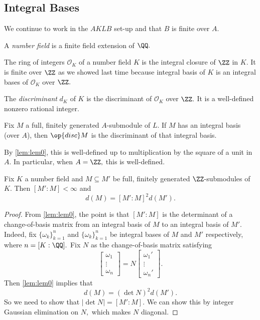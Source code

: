 \documentclass[../notes.tex]{subfiles}
\begin{document}
\subsection{Integral Bases}
We continue to work in the $AKLB$ set-up and that $B$ is finite over $A.$
\begin{defi}
    A \textit{number field} is a finite field extension of $\QQ.$
\end{defi}
\begin{defi}
    The ring of integers $\mathcal O_K$ of a number field $K$ is the integral closure of $\ZZ$ in $K.$ It is finite over $\ZZ$ as we showed last time because integral basis of $K$ is an integral bases of $\mathcal O_K$ over $\ZZ.$
\end{defi}
\begin{defi}[Discriminant]
    The \textit{discriminant} $d_K$ of $K$ is the discriminant of $\mathcal O_K$ over $\ZZ.$ It is a well-defined nonzero rational integer.
\end{defi}
\begin{defi}
    Fix $M$ a full, finitely generated $A$-submodule of $L.$ If $M$ has an integral basis (over $A$), then $\op{disc}M$ is the discriminant of that integral basis.
\end{defi}
\begin{remark}
    By \autoref{lem:lem0}, this is well-defined up to multiplication by the square of a unit in $A.$ In particular, when $A=\ZZ,$ this is well-defined.
\end{remark}
\begin{prop} \label{prop:212}
    Fix $K$ a number field and $M\subseteq M'$ be full, finitely generated $\ZZ$-submodules of $K.$ Then $[M':M]<\infty$ and
    \[d(M)=[M':M]^2d(M').\]
\end{prop}
\begin{proof}
    From \autoref{lem:lem0}, the point is that $[M':M]$ is the determinant of a change-of-basis matrix from an integral basis of $M$ to an integral basis of $M'.$ Indeed, fix $\{\omega_k\}_{k=1}^n$ and $\{\omega_k\}_{k=1}^n$ be integral bases of $M$ and $M'$ respectively, where $n=[K:\QQ].$ Fix $N$ as the change-of-basis matrix satisfying
    \[\begin{bmatrix}\omega_1 \\ \vdots \\ \omega_n\end{bmatrix}=N\begin{bmatrix}\omega_1' \\ \vdots \\ \omega_n'\end{bmatrix}.\]
    Then \autoref{lem:lem0} implies that
    \[d(M)=(\det N)^2d(M').\]
    So we need to show that $|\det N|=[M':M].$ We can show this by integer Gaussian elimination on $N,$ which makes $N$ diagonal. 
\end{proof}
\end{document}
